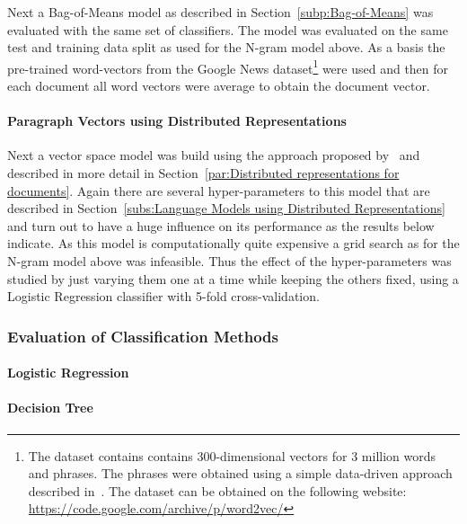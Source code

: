 Next a Bag-of-Means model as described in Section~\ref{subp:Bag-of-Means} was evaluated with the same set of classifiers. The model was evaluated on the same test and training data split as used for the N-gram model above. As a basis the pre-trained word-vectors from the Google News dataset\footnote{The dataset contains contains 300-dimensional vectors for 3 million words and phrases. The phrases were obtained using a simple data-driven approach described in~\cite{Mikolov:2013ab}. The dataset can be obtained on the following website: \url{https://code.google.com/archive/p/word2vec/}} were used and then for each document all word vectors were average to obtain the document vector.

\paragraph{Paragraph Vectors using Distributed Representations}
\label{par:Paragraph Vectors using Distributed Representations}

Next a vector space model was build using the approach proposed by~\cite{Le:2014aa} and described in more detail in Section~\ref{par:Distributed representations for documents}. Again there are several hyper-parameters to this model that are described in Section~\ref{subs:Language Models using Distributed Representations} and turn out to have a huge influence on its performance as the results below indicate. As this model is computationally quite expensive a grid search as for the N-gram model above was infeasible. Thus the effect of the hyper-parameters was studied by just varying them one at a time while keeping the others fixed, using a Logistic Regression classifier with 5-fold cross-validation.

\subsubsection*{Evaluation of Classification Methods}
\label{subs:Evaluation of Classification Methods}

\paragraph{Logistic Regression}
\label{par:Logistic Regression}

\paragraph{Decision Tree}
\label{par:Decision Tree}

